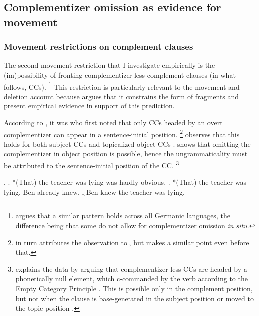 \subsection{Complementizer omission as evidence for movement}\label{sec:ccs-background}
\subsubsection{Movement restrictions on complement clauses}
The second movement restriction that I investigate empirically is the (im)possibi\-lity of fronting complementizer-less complement clauses (in what follows, CCs).%
%
\footnote{\citet[83--85]{webelhuth1992} argues that a similar pattern holds across all Germanic languages, the difference being that some do not allow for complementizer omission \textit{in situ}.} %
%
This restriction is particularly relevant to the movement and deletion account because \citet{merchant2004} argues that it constrains the form of fragments and \citet{merchant.etal2013} present empirical evidence in support of this prediction.

According to \citet{merchant2004}, it was \citet{stowell1981} who first noted that only CCs headed by an overt complementizer can appear in a sentence-initial position.%
%
\footnote{\citet{stowell1981} in turn attributes the observation to \citet{kayne1981}, but \citet[744]{morgan1973} makes a similar point even before that.}\afterfn%
%
\citet[396f]{stowell1981} observes that this holds for both subject CCs \Next[a] and topicalized object CCs \Next[b]. \Next[c] shows that omitting the complementizer in object position is possible, hence the ungrammaticality must be attributed to the sentence-initial position of the CC.%
%
\footnote{
\citet[396]{stowell1981} explains the data by arguing that complementizer-less CCs are headed by a phonetically null element, which c-commanded by the verb according to the Empty Category Principle \citep{chomsky1981}. This is possible only in the complement position, but not when the clause is base-generated in the subject position \Last[a] or moved to the topic position \Last[b].}\afterfn%
%

\ex. \a. *(That) the teacher was lying was hardly obvious.
      \b. *(That) the teacher was lying, Ben already knew.
 \c. Ben knew the teacher was lying.

